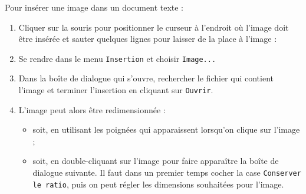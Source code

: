 Pour insérer une image dans un document texte :

\begin{enumerate}
\item Cliquer sur la souris pour positionner le curseur à l'endroit où l'image doit être insérée et sauter quelques lignes pour laisser de la place à l'image :


\item Se rendre dans le menu \texttt{Insertion} et choisir \texttt{Image...}


\item Dans la boîte de dialogue qui s'ouvre, rechercher le fichier qui contient l'image et terminer l'insertion en cliquant sur \texttt{Ouvrir}.

\item L'image peut alors être redimensionnée :
        \begin{itemize}
        \item soit, en utilisant les poignées qui apparaissent lorsqu'on clique sur l'image ;
        \item soit, en double-cliquant sur l'image pour faire apparaître la boîte de dialogue suivante. Il faut dans un premier temps cocher la case \texttt{Conserver le ratio}, puis on peut régler les dimensions souhaitées pour l'image.
        \end{itemize}
\end{enumerate}


